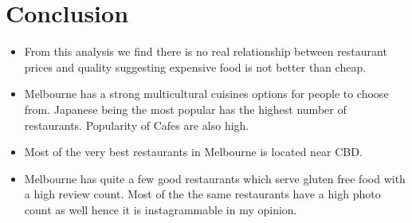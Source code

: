 \documentclass[11pt,a4paper,]{article}
\providecommand{\tightlist}{%
  \setlength{\itemsep}{0pt}\setlength{\parskip}{0pt}}
\begin{document}
\clearpage

\hypertarget{conclusion}{%
\section{Conclusion}\label{conclusion}}

\begin{itemize}
\tightlist
\item
  From this analysis we find there is no real relationship between restaurant prices and quality suggesting expensive food is not better than cheap.
\item
  Melbourne has a strong multicultural cuisines options for people to choose from. Japanese being the most popular has the highest number of restaurants. Popularity of Cafes are also high.
\item
  Most of the very best restaurants in Melbourne is located near CBD.
\item
  Melbourne has quite a few good restaurants which serve gluten free food with a high review count. Most of the the same restaurants have a high photo count as well hence it is instagrammable in my opinion.
\end{itemize}

\clearpage

\printbibliography
\end{document}
